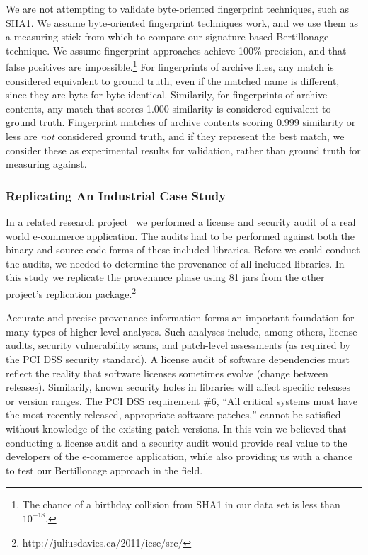 We are not attempting to validate byte-oriented fingerprint techniques,
such as SHA1.  We assume byte-oriented fingerprint techniques work, and we
use them as a measuring stick from which to compare our signature based
Bertillonage technique.  We assume fingerprint approaches achieve 100\%
precision, and that false positives are impossible.\footnote{The chance of
a birthday collision from SHA1 in our data set is less than $10^{-18}$.}
For fingerprints of archive files, any match is considered equivalent to
ground truth, even if the matched name is different, since they are
byte-for-byte identical.  Similarily, for fingerprints of archive contents,
any match that scores 1.000 similarity is considered equivalent to ground
truth.  Fingerprint matches of archive contents scoring 0.999 similarity or
less are \emph{not} considered ground truth, and if they represent the best
match, we consider these as experimental results for validation, rather
than ground truth for measuring against.


\subsubsection{Replicating An Industrial Case Study}

In a related research project~\cite{Davies11} we performed a license
and security audit of a real world e-commerce application.  The audits had
to be performed against both the binary and source code forms of these
included libraries.  Before we could conduct the audits, we needed to
determine the provenance of all included libraries.  In this study we
replicate the provenance phase using 81 jars from the other project's
replication package.\footnote{http://juliusdavies.ca/2011/icse/src/}

Accurate and precise provenance information forms an important foundation
for many types of higher-level analyses.  Such analyses include, among
others, license audits, security vulnerability scans, and patch-level
assessments (as required by the PCI DSS security standard).  A license
audit of software dependencies must reflect the reality that software
licenses sometimes evolve (change between releases).  Similarily, known
security holes in libraries will affect specific releases or version
ranges.  The PCI DSS requirement \#6, ``All critical systems must have the
most recently released, appropriate software patches,'' cannot be satisfied
without knowledge of the existing patch versions.  In this vein we believed
that conducting a license audit and a security audit would provide real
value to the developers of the e-commerce application, while also providing
us with a chance to test our Bertillonage approach in the field.



